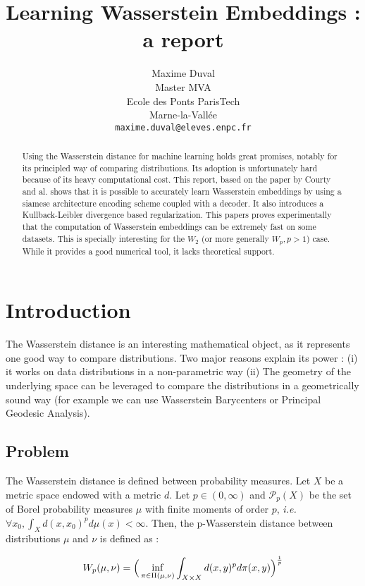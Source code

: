\documentclass{article}
\title{Learning Wasserstein Embeddings : a report}
\author{%
  Maxime Duval\\
  Master MVA\\
  Ecole des Ponts ParisTech\\
  Marne-la-Vallée \\
  \texttt{maxime.duval@eleves.enpc.fr} \\
}
\begin{document}
\maketitle

\begin{abstract}
  Using the Wasserstein distance for machine learning holds great promises, notably for its principled way of comparing distributions. Its adoption is unfortunately hard because of its heavy computational cost. This report, based on the paper by Courty and al. \cite{courty:hal-01956306} shows that it is possible to accurately learn Wasserstein embeddings by using a siamese architecture encoding scheme coupled with a decoder. It also introduces a Kullback-Leibler divergence based regularization. This papers proves experimentally that the computation of Wasserstein embeddings can be extremely fast on some datasets. This is specially interesting for the $W_2$ (or more generally $W_p, p > 1$) case. While it provides a good numerical tool, it lacks theoretical support. 
\end{abstract}

\section{Introduction}

The Wasserstein distance is an interesting mathematical object, as it represents one good way to compare distributions. Two major reasons explain its power : (i) it works on data distributions in a non-parametric way (ii) The geometry of the underlying space can be leveraged to compare the distributions in a geometrically sound way (for example we can use Wasserstein Barycenters or Principal Geodesic Analysis). 

\subsection{Problem}

The Wasserstein distance is defined between probability measures. Let $X$ be a metric space endowed with a metric $d$. Let $p \in (0, \infty)$ and $\mathcal{P}_p(X)$ be the set of Borel probability measures $\mu$ with finite moments of order $p$, \textit{i.e.} $\forall x_0, \int_X d(x, x_0)^p d\mu(x) < \infty$. Then, the p-Wasserstein distance between distributions $\mu$ and $\nu$ is defined as :

$$
W_p(\mu, \nu) = \Big{(} \inf_{\pi \in \Pi(\mu, \nu)} \int_{X \times X} d(x, y)^p d\pi(x, y) \Big{)}^{\frac{1}{p}}
$$
\end{document}
